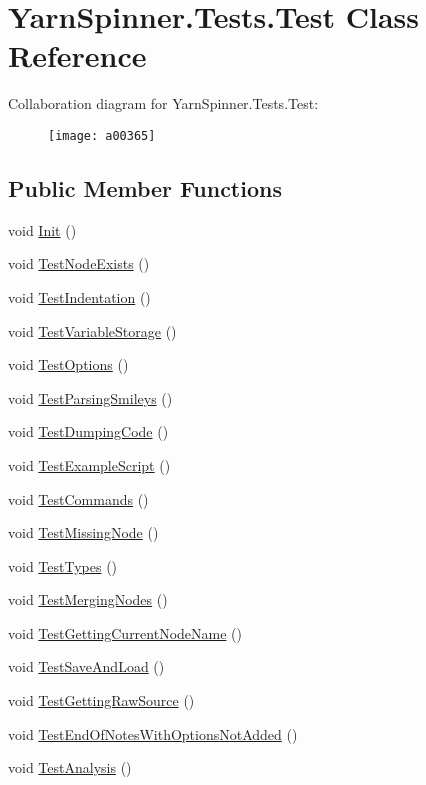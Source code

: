 \hypertarget{a00077}{\section{Yarn\-Spinner.\-Tests.\-Test Class Reference}
\label{a00077}
}


Collaboration diagram for Yarn\-Spinner.\-Tests.\-Test\-:
\nopagebreak
\begin{figure}[H]
\begin{center}
\leavevmode
\texttt{[image: a00365]}
\end{center}
\end{figure}
\subsection*{Public Member Functions}
\begin{DoxyCompactItemize}
\item 
void \hyperlink{a00077_a1a64841e6815e57869c1132427a44349}{Init} ()
\item 
void \hyperlink{a00077_a2beee99e50888b2813bb4cb1b5d7db1f}{Test\-Node\-Exists} ()
\item 
void \hyperlink{a00077_a7367e28f0328bc09e1129c2c86026d34}{Test\-Indentation} ()
\item 
void \hyperlink{a00077_aa27a8cd7c1926ae4d92956a5f6a24d9e}{Test\-Variable\-Storage} ()
\item 
void \hyperlink{a00077_aecbebd20a89e19887c38cc45deb33551}{Test\-Options} ()
\item 
void \hyperlink{a00077_a9d1192dcf67863cfc835368d1c14916f}{Test\-Parsing\-Smileys} ()
\item 
void \hyperlink{a00077_a7ff97d839b8ce04eb6493afd4698c829}{Test\-Dumping\-Code} ()
\item 
void \hyperlink{a00077_afe989298d1984b105f2f187a42d54134}{Test\-Example\-Script} ()
\item 
void \hyperlink{a00077_a95f63c81611bdee5f210c61201546658}{Test\-Commands} ()
\item 
void \hyperlink{a00077_addf4c602c21c9c541adee828f8b7c0f8}{Test\-Missing\-Node} ()
\item 
void \hyperlink{a00077_a2d3abf96f13b1a8f111952e5294ada67}{Test\-Types} ()
\item 
void \hyperlink{a00077_a65c83f97636c7d2c0ba63d1ed0fa7881}{Test\-Merging\-Nodes} ()
\item 
void \hyperlink{a00077_a8eaf016cf430c42648190a2fdd9e9ad2}{Test\-Getting\-Current\-Node\-Name} ()
\item 
void \hyperlink{a00077_aaa4a2d0a30511d5d12459e3bb470b615}{Test\-Save\-And\-Load} ()
\item 
void \hyperlink{a00077_a6ba6563aea2806d7ec783f0bb4d26932}{Test\-Getting\-Raw\-Source} ()
\item 
void \hyperlink{a00077_a3f4243133a4195c80f39469f2d9875d2}{Test\-End\-Of\-Notes\-With\-Options\-Not\-Added} ()
\item 
void \hyperlink{a00077_a7034c82755c2b23d547102aa41770df1}{Test\-Analysis} ()
\end{DoxyCompactItemize}
